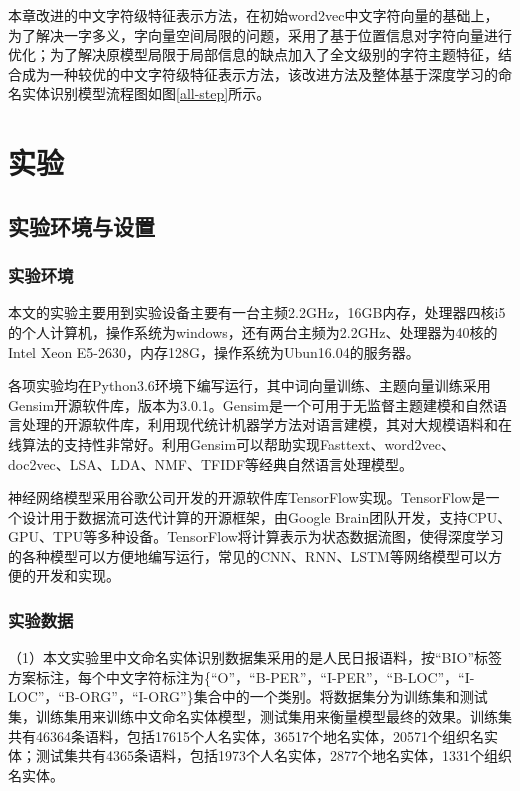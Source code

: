 \documentclass[winfonts,master,oneside,nobackinfo]{njuthesis}
\begin{document}
本章改进的中文字符级特征表示方法，在初始word2vec中文字符向量的基础上，为了解决一字多义，字向量空间局限的问题，采用了基于位置信息对字符向量进行优化；为了解决原模型局限于局部信息的缺点加入了全文级别的字符主题特征，结合成为一种较优的中文字符级特征表示方法，该改进方法及整体基于深度学习的命名实体识别模型流程图如图\ref{all-step}所示。



\section{实验}

\subsection{实验环境与设置}

\subsubsection{实验环境}

本文的实验主要用到实验设备主要有一台主频2.2GHz，16GB内存，处理器四核i5的个人计算机，操作系统为windows，还有两台主频为2.2GHz、处理器为40核的Intel Xeon E5-2630，内存128G，操作系统为Ubun16.04的服务器。

各项实验均在Python3.6环境下编写运行，其中词向量训练、主题向量训练采用Gensim开源软件库，版本为3.0.1。Gensim是一个可用于无监督主题建模和自然语言处理的开源软件库，利用现代统计机器学方法对语言建模，其对大规模语料和在线算法的支持性非常好。利用Gensim可以帮助实现Fasttext、word2vec、doc2vec、LSA、LDA、NMF、TFIDF等经典自然语言处理模型。

神经网络模型采用谷歌公司开发的开源软件库TensorFlow\cite{TensorFlow}实现。TensorFlow是一个设计用于数据流可迭代计算的开源框架，由Google Brain团队开发，支持CPU、GPU、TPU等多种设备。TensorFlow将计算表示为状态数据流图，使得深度学习的各种模型可以方便地编写运行，常见的CNN、RNN、LSTM等网络模型可以方便的开发和实现。

\subsubsection{实验数据}

（1）本文实验里中文命名实体识别数据集采用的是人民日报语料，按“BIO”标签方案标注，每个中文字符标注为\{“O”，“B-PER”，“I-PER”，“B-LOC”，“I-LOC”，“B-ORG”，“I-ORG”\}集合中的一个类别。将数据集分为训练集和测试集，训练集用来训练中文命名实体模型，测试集用来衡量模型最终的效果。训练集共有46364条语料，包括17615个人名实体，36517个地名实体，20571个组织名实体；测试集共有4365条语料，包括1973个人名实体，2877个地名实体，1331个组织名实体。
\end{document}
